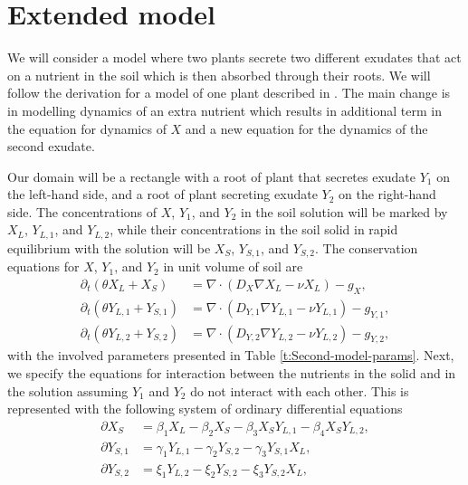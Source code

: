 \documentclass[11pt]{article}
\numberwithin{equation}{section}
\begin{document}
\newpage


\section{Extended model}
\label{sec:Extension}
We will consider a model where two plants secrete two different exudates that act on a nutrient in the soil which is then absorbed through their roots. We will follow the derivation for a model of one plant described in \cite{Ptashnyk-2011}. The main change is in modelling dynamics of an extra nutrient which results in additional term in the equation for dynamics of $X$ and a new equation for the dynamics of the second exudate.
	
Our domain will be a rectangle with a root of plant that secretes exudate $Y_1$ on the left-hand side, and a root of plant secreting exudate $Y_2$ on the right-hand side. The concentrations of $X$, $Y_1$, and $Y_2$ in the soil solution will be marked by $X_L$, $Y_{L,1}$, and $Y_{L,2}$, while their concentrations in the soil solid in rapid equilibrium with the solution will be $X_S$, $Y_{S,1}$, and $Y_{S,2}$. The conservation equations for $X$, $Y_1$, and $Y_2$ in unit volume of soil are
\begin{subequations}
\label{x_1}
\begin{align}
	\partial_t(\theta X_L + X_S) &= \nabla \cdot(D_X \nabla X_L - \nu X_L) - g_X, \\
	\partial_t(\theta Y_{L,1} + Y_{S,1}) &= \nabla \cdot(D_{Y,1} \nabla Y_{L,1} - \nu Y_{L,1}) - g_{Y,1}, \\
	\partial_t(\theta Y_{L,2} + Y_{S,2}) &= \nabla \cdot(D_{Y,2} \nabla Y_{L,2} - \nu Y_{L,2}) - g_{Y,2},
\end{align}
\end{subequations}
with the involved parameters presented in Table \ref{t:Second-model-params}. Next, we specify the equations for interaction between the nutrients in the solid and in the solution assuming $Y_1$ and $Y_2$ do not interact with each other. This is represented with the following system of ordinary differential equations
\begin{subequations}
\label{sys:eq-mod-2}
\begin{align}
	\partial X_S &= \beta_1 X_L - \beta_2 X_S - \beta_3 X_S Y_{L,1} - \beta_4 X_S Y_{L,2},  \\
	\partial Y_{S,1} &= \gamma_1 Y_{L,1} - \gamma_2 Y_{S,2} - \gamma_3 Y_{S,1} X_L, \\
	\partial Y_{S,2} &= \xi_1 Y_{L,2} - \xi_2 Y_{S,2} - \xi_3 Y_{S,2} X_L,
\end{align}	
\end{subequations}
\end{document}
